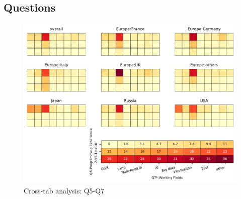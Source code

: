 
\subsection{Questions}


\begin{figure}
\begin{center}
\includegraphics[width=12cm]{../pdfs/Q5-Q7.pdf}
\caption{Cross-tab analysis: Q5-Q7}
\label{fig:Q5-Q7}
\end{center}
\end{figure}

